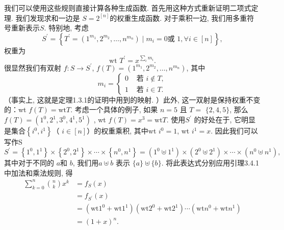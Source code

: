 \documentclass[a4paper,12pt]{ctexbook}
\begin{document}
我们可以使用这些规则直接计算各种生成函数. 首先用这种方式重新证明二项式定理. 我们发现求和一边是 $S=2^{[n]}$的权重生成函数. 对于乘积一边, 我们用多重符号重新表示$S$. 特别地, 考虑
$$
S^{\prime}=\left\{T^{\prime}=\left(1^{m_{1}}, 2^{m_{2}}, \ldots, n^{m_{n}}\right) \mid m_{i}=0 \text {或 } 1 , \forall i\in[n]\right\},
$$
权重为
$$
\text { wt } T^{\prime}=x^{\sum_{i} m_{i}} \text {. }
$$
很显然我们有双射 $f: S \rightarrow S^{\prime}$,  $f(T)=\left(1^{m_{1}}, 2^{m_{2}}, \ldots, n^{m_{n}}\right)$, 其中
$$
m_{i}=\left\{\begin{array}{ll}
0 & \text{ 若 } i \notin T, \\
1 & \text{ 若 } i \in T .
\end{array}\right.
$$
（事实上, 这就是定理1.3.1的证明中用到的映射. ）此外, 这一双射是保持权重不变的：wt $f(T)=\mathrm{wt} T$. 考虑一个具体的例子, 如果 $n=5$ 且 $T=$ $\{2,4,5\}$, 那么 $f(T)=\left(1^{0}, 2^{1}, 3^{0}, 4^{1}, 5^{1}\right)$ ,  wt $f(T)=x^{3}=\mathrm{wt} T$. 使用$S^{\prime}$ 的好处在于, 它明显是集合$\left\{i^{0}, i^{1}\right\}$（ $i \in[n]$）的权重乘积, 其中wt $i^{0}=1$, wt $i^{1}=x$. 因此我们可以写作S
$$
S^{\prime}=\left\{1^{0}, 1^{1}\right\} \times\left\{2^{0}, 2^{1}\right\} \times \cdots \times\left\{n^{0}, n^{1}\right\}=\left(1^{0} \uplus 1^{1}\right) \times\left(2^{0} \uplus 2^{1}\right) \times \cdots \times\left(n^{0} \uplus n^{1}\right) ,
$$
其中对于不同的 $a$和 $b$, 我们用$a \uplus b$ 表示 $\{a\} \uplus\{b\}$. 将此表达式分别应用引理3.4.1中加法和乘法规则, 得
$$
\begin{aligned}
\sum_{k=0}^{n}\binom{n}{k} x^{k} &=f_{S}(x)\\
&=f_{S^{\prime}}(x) \\
&=\left(\mathrm{wt} 1^{0}+\mathrm{wt} 1^{1}\right)\left(\mathrm{wt} 2^{0}+\mathrm{wt} 2^{1}\right) \cdots\left(\mathrm{wt} n^{0}+\mathrm{wt} n^{1}\right) \\
&=(1+x)^{n}.
\end{aligned}
$$
\end{document}
